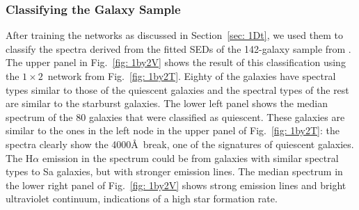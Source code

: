         \subsubsection{Classifying the Galaxy Sample}
         \label{sec: 1Dv}
            After training the networks as discussed in Section~\ref{sec: 1Dt}, we used them to classify the spectra derived from the fitted SEDs of the 142-galaxy sample from .
            The upper panel in Fig.~\ref{fig: 1by2V} shows the result of this classification using the $1\times2$~network from Fig.~\ref{fig: 1by2T}.
            Eighty of the galaxies have spectral types similar to those of the quiescent galaxies and the spectral types of the rest are similar to the starburst galaxies.
            The lower left panel shows the median spectrum of the 80 galaxies that were classified as quiescent. 
            These galaxies are similar to the ones in the left node in the upper panel of Fig.~\ref{fig: 1by2T}:
            the spectra clearly show the 4000\AA~break, one of the signatures of quiescent galaxies.
            The H$\alpha$ emission in the spectrum could be from galaxies with similar spectral types to Sa galaxies, but with stronger emission lines.
            The median spectrum in the lower right panel of Fig.~\ref{fig: 1by2V} shows strong emission lines and bright ultraviolet continuum, indications of a high star formation rate.
